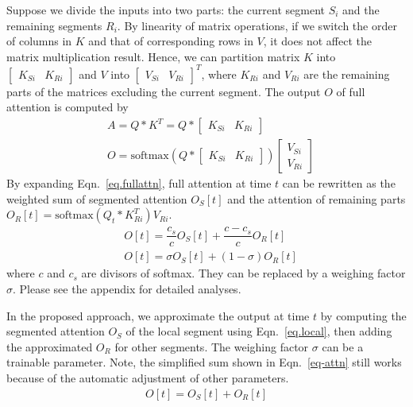 \documentclass[11pt]{article}
\begin{document}
Suppose we divide the inputs into two parts: the current segment $S_i$ and the remaining segments $R_i$. By linearity of matrix operations, if we switch the order of columns in $K$ and that of corresponding rows in $V$, it does not affect the matrix multiplication result. Hence, we can partition matrix $K$ into $\begin{bmatrix} K_{Si} & K_{Ri}\end{bmatrix}$ and $V$ into $\begin{bmatrix} V_{Si} & V_{Ri}
    \end{bmatrix}^T$, where $K_{Ri}$ and $V_{Ri}$ are the remaining parts of the matrices excluding the current segment. The output $O$ of full attention is computed by
\begin{align}
 &A= Q*K^T=    Q *\begin{bmatrix} K_{Si} & K_{Ri}
    \end{bmatrix}
  \\
 & \label{eq.fullattn} O =\text{softmax}( Q *\begin{bmatrix} K_{Si} & K_{Ri}
    \end{bmatrix})\begin{bmatrix} V_{Si} \\ V_{Ri} \end{bmatrix} 
\end{align}
By expanding Eqn.~\ref{eq.fullattn}, full attention at time $t$ can be rewritten as the weighted sum of segmented attention $O_{S}[t]$ and the attention of remaining parts $O_{R}[t]=\text{softmax}(Q_t*K_{Ri}^T) V_{Ri}$.
\begin{align}
  &  O[t] = \dfrac{c_s}{c} O_S[t] + \dfrac{c- c_s}{c}O_R[t] \\
  &  O[t] = \sigma O_S[t]  + (1- \sigma)  O_R [t]
\end{align} 
where $c$ and $c_s$ are divisors of softmax. They can be replaced by a weighing factor $\sigma$. Please see the appendix for detailed analyses.

In the proposed approach, we approximate the output at time $t$ by computing the segmented attention $O_S$ of the local segment using Eqn.~\ref{eq.local}, then adding the approximated $O_R$ for other segments. The weighing factor $\sigma$ can be a trainable parameter. Note, the simplified sum shown in Eqn.~\ref{eq-attn} still works because of the automatic adjustment of other parameters.
\begin{align} 
\label{eq-attn}   O[t] = O_S[t]  + O_R[t] 
\end{align}
\end{document}
